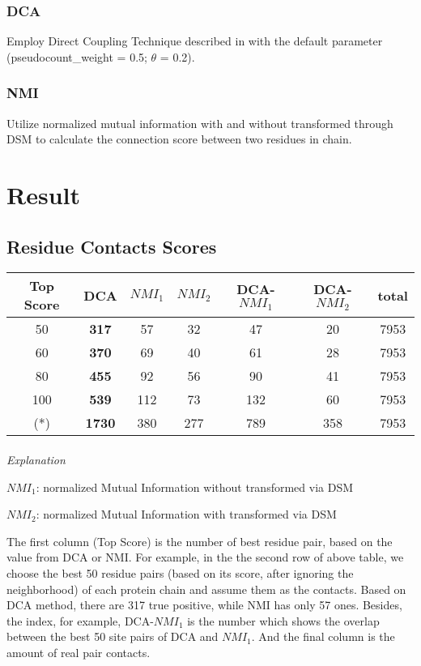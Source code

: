 \documentclass[a4paper,12pt]{article}
\begin{document}
\subsubsection{DCA}
Employ Direct Coupling Technique described in \cite{Morcos11}  with the default parameter (pseudocount\_weight = 0.5; $\theta$ = 0.2).
\subsubsection{NMI}
Utilize normalized mutual information with and without transformed through DSM to calculate the connection score between two residues in chain. 

\section*{Result}
\subsection*{Residue Contacts Scores}
\begin{tabular}{ |c|c|c|c|c|c|c| } \hline
Top Score & DCA & $NMI_1$ & $NMI_2$ & DCA-$NMI_1$ & DCA-$NMI_2$ & total \\\hline
50 & \textbf{317} & 57 & 32 & 47 & 20 & 7953 \\
60 & \textbf{370} & 69 & 40 & 61 & 28 & 7953 \\
80 & \textbf{455} & 92 & 56 & 90 & 41 & 7953 \\
100 & \textbf{539} & 112 & 73 & 132 & 60 & 7953 \\
(*) & \textbf{1730} & 380 & 277 & 789 & 358 & 7953 \\
\hline \end{tabular}

\paragraph{}
\emph{Explanation}

$NMI_1$: normalized Mutual Information without transformed via DSM

$NMI_2$: normalized Mutual Information with transformed via DSM

The first column (Top Score) is the number of best residue pair, based on the value from DCA or NMI. For example, in the the second row of above table, we choose the best 50 residue pairs (based on its score, after ignoring the neighborhood) of each protein chain and assume them as the contacts. Based on DCA method, there are 317 true positive, while NMI has only 57 ones. Besides, the index, for example, DCA-$NMI_1$ is the number which shows the overlap between the best 50 site pairs of DCA and $NMI_1$. And the final column is the amount of real pair contacts.
\end{document}
